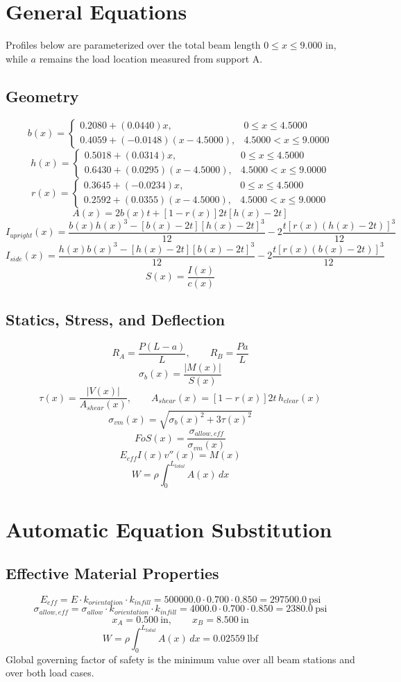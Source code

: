 \documentclass[11pt]{article}
\begin{document}
\section*{General Equations}
Profiles below are parameterized over the total beam length $0 \le x \le 9.000$ in, while $a$ remains the load location measured from support A.
\subsection*{Geometry}
\[
b(x)=\begin{cases}0.2080 + (0.0440)x, & 0 \le x \le 4.5000\\0.4059 + (-0.0148)(x-4.5000), & 4.5000 < x \le 9.0000\end{cases}
\]
\[
h(x)=\begin{cases}0.5018 + (0.0314)x, & 0 \le x \le 4.5000\\0.6430 + (0.0295)(x-4.5000), & 4.5000 < x \le 9.0000\end{cases}
\]
\[
r(x)=\begin{cases}0.3645 + (-0.0234)x, & 0 \le x \le 4.5000\\0.2592 + (0.0355)(x-4.5000), & 4.5000 < x \le 9.0000\end{cases}
\]
\[
A(x)=2b(x)t+[1-r(x)]2t[h(x)-2t]
\]
\[
I_{upright}(x)=\frac{b(x)h(x)^3-[b(x)-2t][h(x)-2t]^3}{12}-2\frac{t[r(x)(h(x)-2t)]^3}{12}
\]
\[
I_{side}(x)=\frac{h(x)b(x)^3-[h(x)-2t][b(x)-2t]^3}{12}-2\frac{t[r(x)(b(x)-2t)]^3}{12}
\]
\[
S(x)=\frac{I(x)}{c(x)}
\]

\subsection*{Statics, Stress, and Deflection}
\[
R_A=\frac{P(L-a)}{L}, \qquad R_B=\frac{Pa}{L}
\]
\[
\sigma_b(x)=\frac{|M(x)|}{S(x)}
\]
\[
\tau(x)=\frac{|V(x)|}{A_{shear}(x)}, \qquad A_{shear}(x)=[1-r(x)]2t\,h_{clear}(x)
\]
\[
\sigma_{vm}(x)=\sqrt{\sigma_b(x)^2+3\tau(x)^2}
\]
\[
FoS(x)=\frac{\sigma_{allow,eff}}{\sigma_{vm}(x)}
\]
\[
E_{eff}I(x)v''(x)=M(x)
\]
\[
W=\rho\int_0^{L_{total}} A(x)\,dx
\]

\section*{Automatic Equation Substitution}
\subsection*{Effective Material Properties}
\[E_{eff} = E \cdot k_{orientation} \cdot k_{infill} = 500000.0 \cdot 0.700 \cdot 0.850 = 297500.0\ \mathrm{psi}\]
\[\sigma_{allow,eff} = \sigma_{allow} \cdot k_{orientation} \cdot k_{infill} = 4000.0 \cdot 0.700 \cdot 0.850 = 2380.0\ \mathrm{psi}\]
\[x_A = 0.500\ \mathrm{in}, \qquad x_B = 8.500\ \mathrm{in}\]
\[W = \rho \int_0^{L_{total}} A(x)\,dx = 0.02559\ \mathrm{lbf}\]
Global governing factor of safety is the minimum value over all beam stations and over both load cases.
\end{document}
